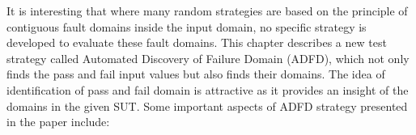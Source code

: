 






It is interesting that where many random strategies are based on the principle of contiguous fault domains inside the input domain, no specific strategy is developed to evaluate these fault domains. This chapter describes a new test strategy called Automated Discovery of Failure Domain (ADFD), which not only finds the pass and fail input values but also finds their domains. The idea of identification of pass and fail domain is attractive as it provides an insight of the domains in the given SUT. Some important aspects of ADFD strategy presented in the paper include:

